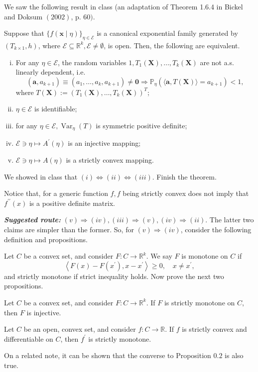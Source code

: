 \begin{exercise}
    We saw the following result in class (an adaptation of Theorem 1.6.4 in Bickel and Doksum \((2002)\), p. 60\()\).
    
     Suppose that \(\{f(\boldsymbol{x} \mid \eta)\}_{\eta \in \mathcal{E}}\) is a canonical exponential family generated by \(\left(T_{k \times 1}, h\right)\), where \(\mathcal{E} \subseteq \mathbb{R}^{k}, \mathcal{E} \neq \emptyset\), is open. Then, the following are equivalent.
    \begin{enumerate}[(i)]
        \item For any \(\eta \in \mathcal{E}\), the random variables \(1, T_{1}(\boldsymbol{X}), \ldots, T_{k}(\boldsymbol{X})\) are not a.s. linearly dependent, i.e.
        \[
            \left(\mathbf{a}, a_{k+1}\right) \equiv\left(a_{1}, \ldots, a_{k}, a_{k+1}\right) \neq \mathbf{0} \Rightarrow \mathbb{P}_{\eta}\left(\langle\mathbf{a}, T(\boldsymbol{X})\rangle=a_{k+1}\right)<1, 
        \]
        where \(T(\boldsymbol{X}):=\left(T_{1}(\boldsymbol{X}), \ldots, T_{k}(\boldsymbol{X})\right)^T\); 
        \item \(\eta \in \mathcal{E}\) is identifiable;
        \item for any \(\eta \in \mathcal{E}, \operatorname{Var}_{\eta}(T)\) is symmetric positive definite;
        \item \(\mathcal{E} \ni \eta \mapsto A^{\prime}(\eta)\) is an injective mapping;
        \item \(\mathcal{E} \ni \eta \mapsto A(\eta)\) is a strictly convex mapping. 
    \end{enumerate}
    We showed in class that \((i) \Leftrightarrow(i i) \Leftrightarrow(i i i)\). Finish the theorem.
    
     Notice that, for a generic function \(f, f\) being strictly convex does not imply that \(f^{\prime \prime}(x)\) is a positive definite matrix.

    \emph{\bfseries Suggested route:} \((v) \Rightarrow(i v),(i i i) \Rightarrow(v),(i v) \Rightarrow(i i)\). The latter two claims are simpler than the former. So, for \((v) \Rightarrow(i v)\), consider the following definition and propositions. 

     Let \(C\) be a convex set, and consider \(F: C \rightarrow \mathbb{R}^{k}\). We say \(F\) is monotone on \(C\) if
    \[
    \left\langle F(x)-F\left(x^{\prime}\right), x-x^{\prime}\right\rangle \geq 0, \quad x \neq x^{\prime},
    \]
    and strictly monotone if strict inequality holds. Now prove the next two propositions. 

     Let \(C\) be a convex set, and consider \(F: C \rightarrow \mathbb{R}^{k}\). If \(F\) is strictly monotone on \(C\), then \(F\) is injective.

     Let \(C\) be an open, convex set, and consider \(f: C \rightarrow \mathbb{R}\). If \(f\) is strictly convex and differentiable on \(C\), then \(f^{\prime}\) is strictly monotone.

    On a related note, it can be shown that the converse to Proposition \(0.2\) is also true.
\end{exercise}

